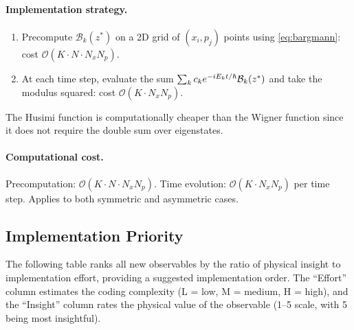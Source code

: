 \paragraph{Implementation strategy.}

\begin{enumerate}[label=(\roman*)]
  \item Precompute $\mathcal{B}_k(z^*)$ on a 2D grid of $(x_i,p_j)$ points using \cref{eq:bargmann}: cost $\mathcal{O}(K\cdot N\cdot N_x N_p)$.
  \item At each time step, evaluate the sum $\sum_k c_k e^{-iE_k t/\hbar}\mathcal{B}_k(z^*)$ and take the modulus squared: cost $\mathcal{O}(K\cdot N_x N_p)$.
\end{enumerate}
The Husimi function is computationally cheaper than the Wigner function since it does not require the double sum over eigenstates.

\paragraph{Computational cost.}
Precomputation: $\mathcal{O}(K\cdot N\cdot N_x N_p)$.
Time evolution: $\mathcal{O}(K\cdot N_x N_p)$ per time step.
Applies to both symmetric and asymmetric cases.

\subsection{Implementation Priority}\label{sec:priority}

The following table ranks all new observables by the ratio of physical insight to implementation effort, providing a suggested implementation order.
The ``Effort'' column estimates the coding complexity (L = low, M = medium, H = high), and the ``Insight'' column rates the physical value of the observable (1--5 scale, with 5 being most insightful).

